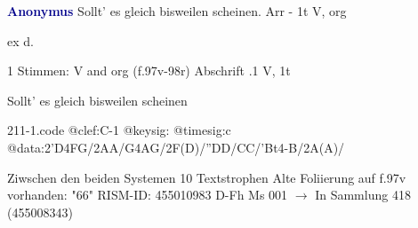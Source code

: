 \documentclass[twocolumn]{book}
\begin{document}
\newline \par \vspace{7pt} \textcolor{darkblue}{\textbf{Anonymus  }}
\newline Sollt' es gleich bisweilen scheinen. Arr - 1t
\newline V, org
\newline \begin{itshape}[f.97v, at left:] ex d.\end{itshape} 
\newline \textcolor{darkblue}{}  1 Stimmen: V and org  (f.97v-98r)
\newline Abschrift
.1  V, 1t
\newline \begin{footnotesize} Sollt' es gleich bisweilen scheinen \end{footnotesize}  
\begin{filecontents*}{211-1.code}
@clef:C-1
@keysig:
@timesig:c
@data:2'D4FG/2AA/G4AG/2F(D)/''DD/CC/'Bt4-B/2A(A)/
\end{filecontents*}
\newline
%
\newline Ziwschen den beiden Systemen 10 Textstrophen
\newline Alte Foliierung auf f.97v vorhanden: "66"
\newline RISM-ID: 455010983
\newline D-Fh  Ms 001
\newline $\rightarrow$ In Sammlung 418 (455008343)
      
\end{document}
